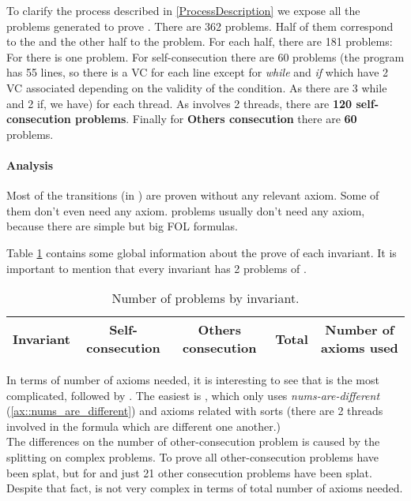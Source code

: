 To clarify the process described in \ref{ProcessDescription} we expose all the \spass problems generated to prove \invDisjoint.
%
There are 362 \spass problems. Half of them correspond to the \reducedProblem and the other half to the \smallToBig problem.
%
For each half, there are 181 \spass problems:
%
For \textbf{\instantiation} there is one problem. 
%
For self-consecution there are 60 \spass problems (the program has 55 lines, so there is a \gls{VC} for each line except for \textit{while} and \textit{if} which have 2 \gls{VC} associated depending on the validity of the condition. As there are 3 while and 2 if, we have) for each thread. 
%
As \invDisjoint involves 2 threads, there are \textbf{120 self-consecution \spass problems}.
%
Finally for \textbf{Others consecution} there are \textbf{60} \spass problems.

\paragraph{Analysis}

Most of the transitions (\numTransitionsProvedWithPC in \numTotalTransitions) are proven without any relevant axiom. 
%
Some of them don't even need any axiom. 
%
\smallToBig problems usually don't need any axiom, because there are simple but big \gls{FOL} formulas.

Table \ref{table:analysisProofs}  contains some global information about the prove of each invariant.
%
It is important to mention that every invariant has 2 problems of \instantiation. 

\begin{table}[hbtp]
\centering
\begin{tabular}{c|cccc}
Invariant & Self-consecution & Others consecution & Total & Number of axioms used\\\hline

\end{tabular}
\label{table:analysisProofs}
\caption{Number of \spass problems by invariant.}
\end{table}



In terms of number of axioms needed, it is interesting to see that \invLock is the most complicated, followed by \invNext.  
%
The easiest is \invDisjoint, which only uses \textit{nums-are-different} (\ref{ax::nums_are_different}) and axioms related with sorts (there are 2 threads involved in the formula which are different one another.)
\\
The differences on the number of other-consecution problem is caused by the splitting on complex \spass problems. 
%
To prove \invOrder all other-consecution problems have been splat, but for \invLock and \invNext just 21 other consecution problems have been splat.
%
Despite that fact, \invOrder is not very complex in terms of total number of axioms needed.

